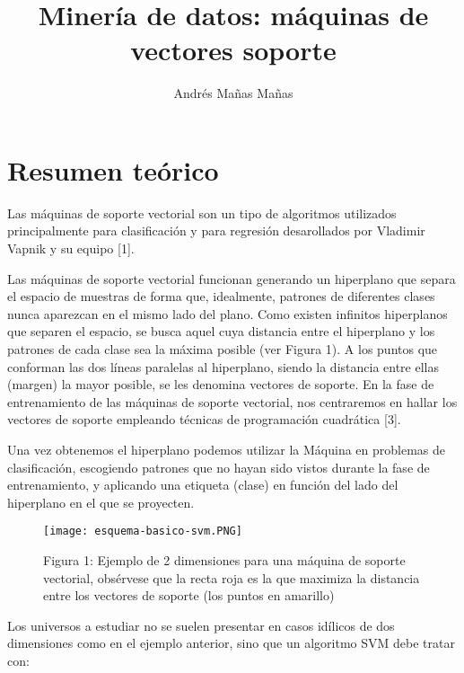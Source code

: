 \documentclass[11pt]{article}
\title{Minería de datos: máquinas de vectores soporte}
\author{Andrés Mañas Mañas}
\makeatletter
\def\maxwidth{\ifdim\Gin@nat@width>\linewidth\linewidth
    \else\Gin@nat@width\fi}
\let\Oldincludegraphics\includegraphics
\renewcommand{\includegraphics}[1]{\Oldincludegraphics[width=.8\maxwidth]{#1}}
\makeatother
\begin{document}
    
    
    \maketitle
    
 





  \thispagestyle{empty}

    \clearpage  
 
    \tableofcontents 
    \setcounter{page}{1}

   \clearpage  

    \section{Resumen teórico}\label{resumen-teuxf3rico}

Las máquinas de soporte vectorial son un tipo de algoritmos utilizados
principalmente para clasificación y para regresión desarollados por
Vladimir Vapnik y su equipo {[}1{]}.

Las máquinas de soporte vectorial funcionan generando un hiperplano que
separa el espacio de muestras de forma que, idealmente, patrones de
diferentes clases nunca aparezcan en el mismo lado del plano. Como
existen infinitos hiperplanos que separen el espacio, se busca aquel
cuya distancia entre el hiperplano y los patrones de cada clase sea la
máxima posible (ver Figura 1). A los puntos que conforman las dos líneas
paralelas al hiperplano, siendo la distancia entre ellas (margen) la
mayor posible, se les denomina vectores de soporte. En la fase de
entrenamiento de las máquinas de soporte vectorial, nos centraremos en
hallar los vectores de soporte empleando técnicas de programación
cuadrática {[}3{]}.

Una vez obtenemos el hiperplano podemos utilizar la Máquina en problemas
de clasificación, escogiendo patrones que no hayan sido vistos durante
la fase de entrenamiento, y aplicando una etiqueta (clase) en función
del lado del hiperplano en el que se proyecten.

\begin{figure}[h]
\centering
\texttt{[image: esquema-basico-svm.PNG]}
\caption{Figura 1: Ejemplo de 2 dimensiones para una máquina de soporte
vectorial, obsérvese que la recta roja es la que maximiza la distancia
entre los vectores de soporte (los puntos en amarillo)}
\end{figure}

Los universos a estudiar no se suelen presentar en casos idílicos de dos
dimensiones como en el ejemplo anterior, sino que un algoritmo SVM debe
tratar con:
\end{document}
